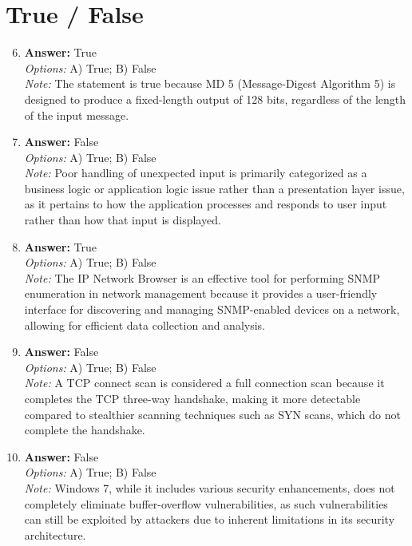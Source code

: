 \documentclass[12pt]{article}
\begin{document}
\section*{True / False}
\begin{enumerate}[label=\arabic*.]
\setcounter{enumi}{5}
\item \textbf{Answer:} True
\\ \textit{Options:} A) True; B) False
\\ \textit{Note:} The statement is true because MD 5 (Message-Digest Algorithm 5) is designed to produce a fixed-length output of 128 bits, regardless of the length of the input message.
\item \textbf{Answer:} False
\\ \textit{Options:} A) True; B) False
\\ \textit{Note:} Poor handling of unexpected input is primarily categorized as a business logic or application logic issue rather than a presentation layer issue, as it pertains to how the application processes and responds to user input rather than how that input is displayed.
\item \textbf{Answer:} True
\\ \textit{Options:} A) True; B) False
\\ \textit{Note:} The IP Network Browser is an effective tool for performing SNMP enumeration in network management because it provides a user-friendly interface for discovering and managing SNMP-enabled devices on a network, allowing for efficient data collection and analysis.
\item \textbf{Answer:} False
\\ \textit{Options:} A) True; B) False
\\ \textit{Note:} A TCP connect scan is considered a full connection scan because it completes the TCP three-way handshake, making it more detectable compared to stealthier scanning techniques such as SYN scans, which do not complete the handshake.
\item \textbf{Answer:} False
\\ \textit{Options:} A) True; B) False
\\ \textit{Note:} Windows 7, while it includes various security enhancements, does not completely eliminate buffer-overflow vulnerabilities, as such vulnerabilities can still be exploited by attackers due to inherent limitations in its security architecture.
\end{enumerate}
\end{document}
